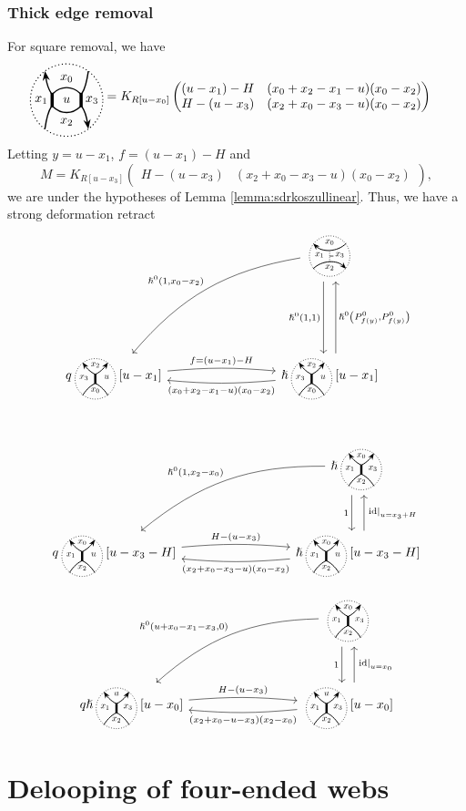\documentclass{article}
\newcommand{\id}{\mathrm{id}}
\theoremstyle{plain} %
\theoremstyle{definition} %
\theoremstyle{remark} %
\begin{document}
\subsubsection{Thick edge removal}
For square removal, we have
\begin{align*}
\SquareStandard{u} &= K_{R[u-x_0]}
    \begin{pmatrix}
    (u-x_1)-H & (x_0+x_2-x_1-u)(x_0-x_2)\\
    H-(u-x_3) & (x_2+x_0-x_3-u)(x_0-x_2)
    \end{pmatrix}
\end{align*}
Letting $y=u-x_1$, $f=(u-x_1)-H$ and 
$$
	M=K_{R[u-x_3]}
		\begin{pmatrix}
			 H-(u-x_3) & (x_2+x_0-x_3-u)(x_0-x_2)
		\end{pmatrix}
	,
$$
 we are under the hypotheses of Lemma \ref{lemma:sdrkoszullinear}. Thus, we have a strong deformation retract
\[
\begin{tikzcd}[column sep=3cm, row sep=2cm]
    &
    \scalebox{0.7}{\UnorientedVerticalThinEdgeStandard} 
    \arrow[d, shift right=2, "{\hslash^0(1,1)}", swap] 
    \arrow[dl, bend right=20, "{\hslash^0(1,x_0-x_2)}",swap] 
    \\   
    q\scalebox{0.7}{\ThickEdge{x_2}{x_3}{x_0}{u}}[u-x_1] 
    \arrow[r, "f=(u-x_1)-H", bend left=5]
    & 
    \hslash\scalebox{0.7}{\ThickEdge{x_2}{x_3}{x_0}{u}}[u-x_1] 
    \arrow[l, "(x_0+x_2-x_1-u)(x_0-x_2)", bend left=5]
    \arrow[u, shift right=2, "{\hslash^0\left(P^0_{f(y)}, P^0_{f(y)}\right)}",swap]
\end{tikzcd}
\]

\
\[
\begin{tikzcd}[column sep=3cm, row sep=1cm]
    & \hslash\scalebox{0.7}{\ThickEdgeStandard} \arrow[d, shift right=2, "1", swap] \arrow[dl, bend right=20, "{\hslash^0(1,x_2-x_0)}", swap] 
    \\q\scalebox{0.7}{\ThickEdge{x_0}{x_1}{x_2}{u}}[u-x_3-H] \arrow[r, "H-(u-x_3)", bend left=5]
    & \hslash\scalebox{0.7}{\ThickEdge{x_0}{x_1}{x_2}{u}}[u-x_3-H] \arrow[l, "(x_2+x_0-x_3-u)(x_0-x_2)", bend left=5]\arrow[u, shift right=2, "{\left.\id\right|_{u=x_3+H}}",swap]
\end{tikzcd}
\]


\[
\begin{tikzcd}[column sep=3cm, row sep=1cm]
    & \scalebox{0.7}{\ThickEdgeStandard} \arrow[d, shift right=2, "1", swap] \arrow[dl, bend right=20, "{\hslash^0(u+x_0-x_1-x_3,0)}", swap] \\
    q\hslash \scalebox{0.7}{\ThickEdge{u}{x_1}{x_2}{x_3}}[u-x_0] \arrow[r, "H-(u-x_3)", bend left=5]& \scalebox{0.7}{\ThickEdge{u}{x_1}{x_2}{x_3}}[u-x_0] \arrow[l, "(x_2+x_0-u-x_3)(x_2-x_0)", bend left=5]\arrow[u, shift right=2, "{\left.\id\right|_{u=x_0}}",swap]
\end{tikzcd}
\]








 \section{Delooping of four-ended webs}
 
\end{document}
